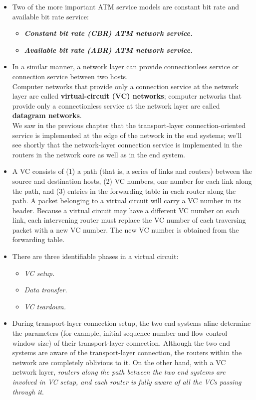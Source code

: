 \begin{itemize}
\item
Two of the more important ATM service models are constant bit rate and available bit rate service:
\begin{itemize}
\item\textit{\textbf{Constant bit rate (CBR) ATM network service.}}
\item\textit{\textbf{Available bit rate (ABR) ATM network service.}}
\end{itemize}

\item
In a similar manner, a network layer can provide connectionless service or connection service between two hosts.\\
Computer networks that provide only a connection service at the network layer are called \textbf{virtual-circuit (VC) networks}; computer networks that provide only a connectionless service at the network layer are called \textbf{datagram networks}.\\
We saw in the previous chapter that the transport-layer connection-oriented service is implemented at the edge of the network in the end systems; we'll see shortly that the network-layer connection service is implemented in the routers in the network core as well as in the end system.

\item
A VC consists of (1) a path (that is, a series of links and routers) between the source and destination hosts, (2) VC numbers, one number for each link along the path, and (3) entries in the forwarding table in each router along the path. A packet belonging to a virtual circuit will carry a VC number in its header. Because a virtual circuit may have a different VC number on each link, each intervening router must replace the VC number of each traversing packet with a new VC number. The new VC number is obtained from the forwarding table.

\item
There are three identifiable phases in a virtual circuit:
\begin{itemize}
\item\textit{VC setup.}
\item\textit{Data transfer.}
\item\textit{VC teardown.}
\end{itemize}

\item
During transport-layer connection setup, the two end systems aline determine the parameters (for example, initial sequence number and flow-control window size) of their transport-layer connection. Although the two end systems are aware of the transport-layer connection, the routers within the network are completely oblivious to it. On the other hand, with a VC network layer, \textit{routers along the path between the two end systems are involved in VC setup, and each router is fully aware of all the VCs passing through it}.


\end{itemize}

